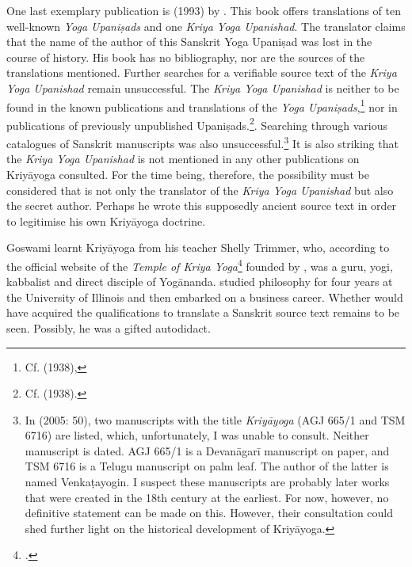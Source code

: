 One last exemplary publication is  (1993) by \citeauthor{kriyayogaupanishad1993}. This book offers translations of ten well-known \textit{Yoga Upaniṣads} and one \textit{Kriya Yoga Upanishad}. The translator claims that the name of the author of this Sanskrit Yoga Upaniṣad was lost in the course of history. His book has no bibliography, nor are the sources of the translations mentioned. Further searches for a verifiable source text of the \textit{Kriya Yoga Upanishad} remain unsuccessful. The \textit{Kriya Yoga Upanishad} is neither to be found in the known publications and translations of the \textit{Yoga Upaniṣads},\footnote{Cf.  (1938),} nor in publications of previously unpublished Upaniṣads.\footnote{Cf.  (1938).}. Searching through various catalogues of Sanskrit manuscripts was also unsuccessful.\footnote{In  (2005: 50), two manuscripts with the title \textit{Kriyāyoga} (AGJ 665/1 and TSM 6716) are listed, which, unfortunately, I was unable to consult. Neither manuscript is dated. AGJ 665/1 is a Devanāgarī manuscript on paper, and TSM 6716 is a Telugu manuscript on palm leaf. The author of the latter is named Venkaṭayogin. I suspect these manuscripts are probably later works that were created in the 18th century at the earliest. For now, however, no definitive statement can be made on this. However, their consultation could shed further light on the historical development of Kriyāyoga.} It is also striking that the \textit{Kriya Yoga Upanishad} is not mentioned in any other publications on Kriyāyoga consulted. For the time being, therefore, the possibility must be considered that \citeauthor{kriyayogaupanishad1993} is not only the translator of the \textit{Kriya Yoga Upanishad} but also the secret author. Perhaps he wrote this supposedly ancient source text in order to legitimise his own Kriyāyoga doctrine.   

Goswami \citeauthor{kriyayogaupanishad1993} learnt Kriyāyoga from his teacher Shelly Trimmer, who, according to the official website of the \textit{Temple of Kriya Yoga}\footnote{\cite{goswamikriyananda}.} founded by \citeauthor{kriyayogaupanishad1993}, was a guru, yogi, kabbalist and direct disciple of Yogānanda. \citeauthor{kriyayogaupanishad1993} studied philosophy for four years at the University of Illinois and then embarked on a business career. Whether \citeauthor{kriyayogaupanishad1993} would have acquired the qualifications to translate a Sanskrit source text remains to be seen. Possibly, he was a gifted autodidact.

